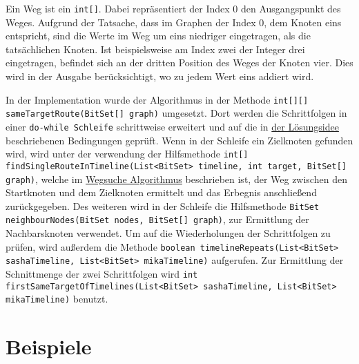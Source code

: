 \documentclass[a4paper,10pt,ngerman]{scrartcl}
\begin{document}
    Ein Weg ist ein \texttt{int[]}.
    Dabei repräsentiert der Index 0 den Ausgangspunkt des Weges.
    Aufgrund der Tatsache,
    dass im Graphen der Index 0, dem Knoten eins entspricht,
    sind die Werte im Weg um eins niedriger eingetragen, als die tatsächlichen Knoten.
    Ist beispielsweise am Index zwei der Integer drei eingetragen,
    befindet sich an der dritten Position des Weges der Knoten vier.
    Dies wird in der Ausgabe berücksichtigt, wo zu jedem Wert eins addiert wird.

    In der Implementation wurde der Algorithmus in der Methode
    \texttt{int[][] sameTargetRoute(BitSet[] graph)} umgesetzt.
    Dort werden die Schrittfolgen in einer \texttt{do-while Schleife} schrittweise erweitert
    und auf die in \hyperref[sec:losungsidee]{der Lösungsidee} beschriebenen Bedingungen geprüft.
    Wenn in der Schleife ein Zielknoten gefunden wird, wird unter der verwendung der Hilfsmethode
    \texttt{int[] findSingleRouteInTimeline(List<BitSet> timeline, int target, BitSet[] graph)},
    welche im \hyperref[alg:Algorithm1]{Wegsuche Algorithmus} beschrieben ist,
    der Weg zwischen den Startknoten und dem Zielknoten ermittelt und das Erbegnis anschließend zurückgegeben.
    Des weiteren wird in der Schleife die Hilfsmethode
    \texttt{BitSet neighbourNodes(BitSet nodes, BitSet[] graph)},
    zur Ermittlung der Nachbarsknoten verwendet.
    Um auf die Wiederholungen der Schrittfolgen zu prüfen, wird außerdem die Methode
    \texttt{boolean timelineRepeats(List<BitSet> sashaTimeline, List<BitSet> mikaTimeline)} aufgerufen.
    Zur Ermittlung der Schnittmenge der zwei Schrittfolgen wird
    \texttt{int firstSameTargetOfTimelines(List<BitSet> sashaTimeline, List<BitSet> mikaTimeline)} benutzt.


    \section{Beispiele}\label{sec:beispiele}
        
\end{document}
